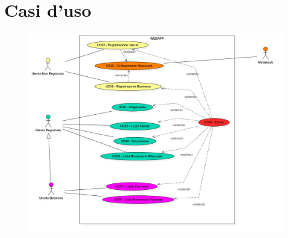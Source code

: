 \section{Casi d'uso}

\begin{figure}[H]
    \centering
    \includegraphics[width=1\textwidth]{use_case/UML_casi.jpg} 
\end{figure}

